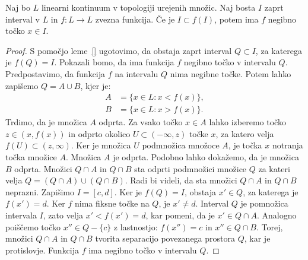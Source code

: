 \documentclass[mat2]{fmfdelo}
\begin{document}
\begin{lema}
Naj bo $L$ linearni kontinuum v topologiji urejenih množic. Naj bosta $I$ zaprt interval v $L$ in $f:L \to L$ zvezna funkcija. Če je $I \subset f(I)$, potem ima $f$ negibno točko $x \in I$.
\end{lema}
\begin{proof}
S pomočjo leme~\ref{} ugotovimo, da obstaja zaprt interval $Q \subset I$, za katerega je $f(Q) = I$. Pokazali bomo, da ima funkcija $f$ negibno točko v intervalu $Q$. Predpostavimo, da funkcija $f$ na intervalu $Q$ nima negibne točke. Potem lahko zapišemo $Q = A \cup B$, kjer je:
\begin{equation*} %
\begin{split}
A &= \{x \in L : x < f(x)\}, \\ 
B &= \{x \in L : x > f(x)\}.
\end{split}
\end{equation*}
Trdimo, da je množica $A$ odprta. Za vsako točko $x \in A$ lahko izberemo točko $z \in (x, f(x))$ in odprto okolico $U \subset  (-\infty, z)$ točke $x$, za katero velja $f(U) \subset (z, \infty)$. Ker je množica $U$ podmnožica množoce $A$, je točka $x$ notranja točka množice $A$. Množica $A$ je odprta. Podobno lahko dokažemo, da je množica $B$ odprta. Množici $Q \cap A$ in $Q \cap B$ sta odprti podmnožici množice $Q$ za kateri velja $Q = (Q \cap A) \cup (Q \cap B)$. Radi bi videli, da sta množici $Q \cap A$ in $Q \cap B$ neprazni. Zapišimo $I = [c, d]$. Ker je $f(Q) = I$, obstaja $x' \in Q$, za katerega je $f(x') =d$. Ker $f$ nima fiksne točke na $Q$, je $x' \neq d$. Interval $Q$ je pomnožica intervala $I$, zato velja $x' < f(x') = d$, kar pomeni, da je $x' \in Q \cap A$. Analogno poiščemo točko $x'' \in Q - \{c\}$ z lastnostjo: $f(x'') = c$ in $x'' \in Q \cap B$. Torej, množici $Q \cap A$ in $Q \cap B$ tvorita separacijo povezanega prostora $Q$, kar je protislovje. Funkcija $f$ ima negibno točko v intervalu $Q$.
\end{proof}



\cleardoublepage                           %

\cleardoublepage                           %
\printindex
\end{document}
